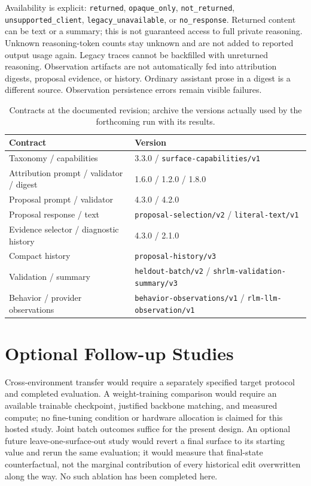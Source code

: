 Availability is explicit: \texttt{returned}, \texttt{opaque\_only},
\texttt{not\_returned}, \texttt{unsupported\_client},
\texttt{legacy\_unavailable}, or \texttt{no\_response}. Returned content can be
text or a summary; this is not guaranteed access to full private reasoning.
Unknown reasoning-token counts stay unknown and are not added to reported output
usage again. Legacy traces cannot be backfilled with unreturned reasoning.
Observation artifacts are not automatically fed into attribution digests,
proposal evidence, or history. Ordinary assistant prose in a digest is a
different source. Observation persistence errors remain visible failures.

\begin{table}[htbp]
\centering\small
\begin{tabularx}{\linewidth}{@{}Xl@{}}
\toprule
Contract & Version \\
\midrule
Taxonomy / capabilities & 3.3.0 / \texttt{surface-capabilities/v1} \\
Attribution prompt / validator / digest & 1.6.0 / 1.2.0 / 1.8.0 \\
Proposal prompt / validator & 4.3.0 / 4.2.0 \\
Proposal response / text & \texttt{proposal-selection/v2} / \texttt{literal-text/v1} \\
Evidence selector / diagnostic history & 4.3.0 / 2.1.0 \\
Compact history & \texttt{proposal-history/v3} \\
Validation / summary & \texttt{heldout-batch/v2} / \texttt{shrlm-validation-summary/v3} \\
Behavior / provider observations & \texttt{behavior-observations/v1} / \texttt{rlm-llm-observation/v1} \\
\bottomrule
\end{tabularx}
\caption{Contracts at the documented revision; archive the versions actually
used by the forthcoming run with its results.}
\end{table}

\section{Optional Follow-up Studies}
\label{app:extensions}
\label{app:finetune}
\label{app:alignment}

Cross-environment transfer would require a separately specified target protocol
and completed evaluation. A weight-training comparison would require an available
trainable checkpoint, justified backbone matching, and measured compute; no
fine-tuning condition or hardware allocation is claimed for this hosted study.
Joint batch outcomes suffice for the present design. An optional future
leave-one-surface-out study would revert a final surface to its starting value
and rerun the same evaluation; it would measure that final-state counterfactual,
not the marginal contribution of every historical edit overwritten along the way.
No such ablation has been completed here.

